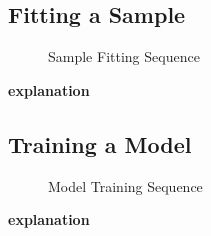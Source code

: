 \subsection{Fitting a Sample}
\begin{figure}[!htb]
    \centering
    \caption{Sample Fitting Sequence}
    \label{fig:seq-fitting-a-sample}
\end{figure}

\textbf{explanation}
\newpage

\subsection{Training a Model}
\begin{figure}[!htb]
    \centering
    \caption{Model Training Sequence}
    \label{fig:seq-training-a-model}
\end{figure}

\textbf{explanation}